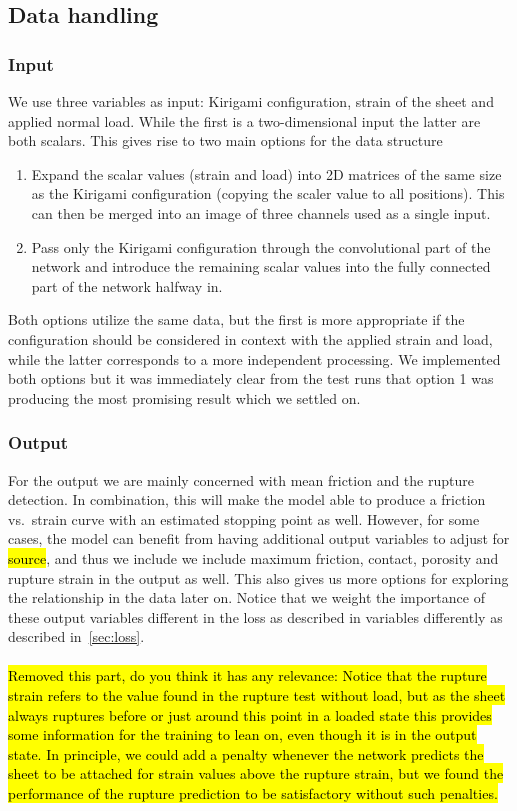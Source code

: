 \subsection{Data handling}
\subsubsection{Input}
We use three variables as input: Kirigami configuration, strain of the sheet
and applied normal load. While the first is a two-dimensional input the latter
are both scalars. This gives rise to two main options for the data structure
\begin{enumerate}
  \item Expand the scalar values (strain and load) into 2D matrices of the same
  size as the Kirigami configuration (copying the scaler value to all positions). This can then be merged into an image of three channels used as a single input.  
  \item Pass only the Kirigami configuration through the convolutional part of the network and introduce the remaining scalar values into the fully connected part of the network halfway in. 
\end{enumerate}
Both options utilize the same data, but the first is more appropriate if the configuration should be considered in context with the applied strain and load, while the latter corresponds to a more independent processing. We implemented both options but it was immediately clear from the test runs that option 1 was producing the most promising result which we settled on.

\subsubsection{Output}
For the output we are mainly concerned with mean friction and the rupture
detection. In combination, this will make the model able to produce a friction vs.\ strain curve with an estimated stopping point as well. However, for some cases, the model can benefit from having additional output variables to adjust for \hl{source}, and thus we include we include maximum friction, contact, porosity and rupture strain in the output as well. This also gives us more options for exploring the relationship in the data later on. Notice that we weight the importance of these output variables different in the loss as described in 
variables differently as described in~\cref{sec:loss}. 
\\
\\
\hl{Removed this part, do you think it has any relevance: Notice that the rupture strain refers to the value found in the rupture test without load, but as the sheet always ruptures before or just around this point in a loaded state this provides some information for the training to lean on, even though it is in the output state. In principle, we could add a penalty whenever the network predicts the sheet to be attached for strain values above the rupture strain, but we found the performance of the rupture prediction to be satisfactory without such penalties.}


